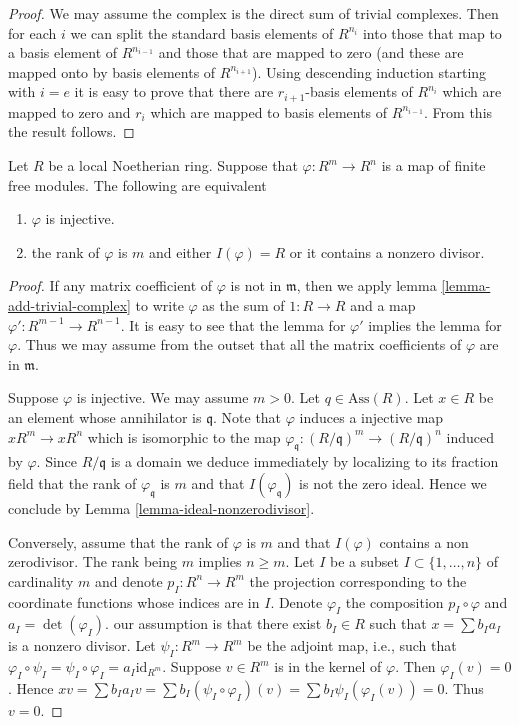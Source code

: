 \begin{proof}
We may assume the complex is the direct sum of trivial
complexes. Then for each $i$ we can split the standard basis
elements of $R^{n_i}$ into those that map to a basis element
of $R^{n_{i-1}}$ and those that are mapped to zero (and these
are mapped onto by basis elements of $R^{n_{i+1}}$).
Using descending
induction starting with $i = e$ it is easy to prove that there
are $r_{i+1}$-basis elements of $R^{n_i}$ which are mapped
to zero and $r_i$ which are mapped to basis elements of
$R^{n_{i-1}}$. From this the result follows.
\end{proof}

\begin{lemma}
\label{lemma-exact-length-1}
Let $R$ be a local Noetherian ring.
Suppose that $\varphi : R^m \to R^n$ is a map
of finite free modules. The following are equivalent
\begin{enumerate}
\item $\varphi$ is injective.
\item the rank of $\varphi$ is $m$ and
either $I(\varphi) = R$ or it contains a nonzero divisor.
\end{enumerate}
\end{lemma}

\begin{proof}
If any matrix coefficient of $\varphi$ is not in $\mathfrak m$,
then we apply lemma \ref{lemma-add-trivial-complex} to write
$\varphi$ as the sum of $1 : R \to R$ and a map
$\varphi' : R^{m-1} \to R^{n-1}$. It is easy to see that
the lemma for $\varphi'$ implies the lemma for $\varphi$.
Thus we may assume from the outset that all the matrix 
coefficients of $\varphi$ are in $\mathfrak m$.

\medskip\noindent
Suppose $\varphi$ is injective. We may assume $m > 0$.
Let $q \in \text{Ass}(R)$. Let $x \in R$ be an element
whose annihilator is $\mathfrak q$. Note that $\varphi$
induces a injective map $xR^m \to xR^n$ which is isomorphic
to the map $\varphi_{\mathfrak q} : (R/\mathfrak q)^m \to (R/\mathfrak q)^n$
induced by $\varphi$. Since $R/\mathfrak q$ is a domain
we deduce immediately by localizing to its fraction field
that the rank of $\varphi_{\mathfrak q}$ is $m$ and that
$I(\varphi_{\mathfrak q})$ is not the zero ideal. Hence we
conclude by Lemma \ref{lemma-ideal-nonzerodivisor}.

\medskip\noindent
Conversely, assume that the rank of $\varphi$ is $m$
and that $I(\varphi)$ contains a non zerodivisor.
The rank being $m$ implies $n \geq m$. Let $I$ be
a subset $I \subset \{1,\ldots,n\}$ of cardinality
$m$ and denote $p_I : R^{n} \to R^m$ the projection
corresponding to the coordinate functions whose indices
are in $I$. Denote $\varphi_I$ the composition
$p_I \circ \varphi$ and $a_I = \det(\varphi_I)$.
our assumption is that there exist $b_I \in R$ such
that $x = \sum b_I a_I$ is a nonzero divisor.
Let $\psi_I : R^m \to R^m$ be the adjoint map, i.e.,
such that $\varphi_I \circ \psi_I = \psi_I \circ \varphi_I = 
a_I \text{id}_{R^m}$. Suppose $v \in R^m$ is in the kernel of $\varphi$.
Then $\varphi_I(v) = 0$. Hence $xv = \sum b_I a_I v 
= \sum b_I (\psi_I \circ \varphi_I)(v)
= \sum b_I \psi_I(\varphi_I(v)) = 0$. Thus $v = 0$.
\end{proof}

